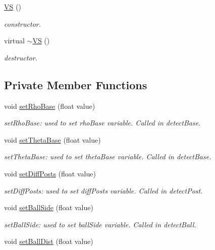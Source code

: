 \begin{DoxyCompactItemize}
\hyperlink{classVS_ad0db74d675b43fd5b41cca3c4aac141f}{V\-S} ()
\begin{DoxyCompactList}\small\item\em constructor. \end{DoxyCompactList}\item 
virtual \hyperlink{classVS_a447bb207cf4b014a6bff5401ce2c45fc}{$\sim$\-V\-S} ()
\begin{DoxyCompactList}\small\item\em destructor. \end{DoxyCompactList}\end{DoxyCompactItemize}
\subsection*{Private Member Functions}
\begin{DoxyCompactItemize}
\item 
void \hyperlink{classVS_a69b52afb6bdcdbb3bfee24f34175083a}{set\-Rho\-Base} (float value)
\begin{DoxyCompactList}\small\item\em set\-Rho\-Base\-: used to set rho\-Base variable. Called in detect\-Base. \end{DoxyCompactList}\item 
void \hyperlink{classVS_a1da28f96dac9cc9a93bfa7e0cf643bf1}{set\-Theta\-Base} (float value)
\begin{DoxyCompactList}\small\item\em set\-Theta\-Base\-: used to set theta\-Base variable. Called in detect\-Base. \end{DoxyCompactList}\item 
void \hyperlink{classVS_ab8e3c44456c3cf5717a5f585e48c2c36}{set\-Diff\-Posts} (float value)
\begin{DoxyCompactList}\small\item\em set\-Diff\-Posts\-: used to set diff\-Posts variable. Called in detect\-Post. \end{DoxyCompactList}\item 
void \hyperlink{classVS_a5cfd34929b678883b32cab5545a77854}{set\-Ball\-Side} (float value)
\begin{DoxyCompactList}\small\item\em set\-Ball\-Side\-: used to set ball\-Side variable. Called in detect\-Ball. \end{DoxyCompactList}\item 
void \hyperlink{classVS_a41147ecec9adc9ca509fae48892e0cec}{set\-Ball\-Dist} (float value)

\end{DoxyCompactItemize}
